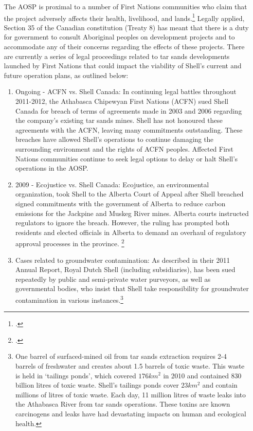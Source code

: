 The AOSP is proximal to a number of First Nations communities who claim that the project adversely affects their health, livelihood, and lands.\footcite[][]{RiskingRuin_2012}  
Legally applied, Section 35 of the Canadian constitution (Treaty 8) has meant that there is a duty for government to consult Aboriginal peoples on development projects and to accommodate any of their concerns regarding the effects of these projects. There are currently a series of legal proceedings related to tar sands developments launched by First Nations that could impact the viability of Shell's current and future operation plans, as outlined below:
\begin{enumerate}
	\item Ongoing - ACFN vs. Shell Canada: In continuing legal battles throughout 2011-2012, the Athabasca Chipewyan First Nations (ACFN) sued Shell Canada for breach of terms of agreements made in 2003 and 2006 regarding the company's existing tar sands mines. Shell has not honoured these agreements with the ACFN, leaving many commitments outstanding. These breaches have allowed Shell's operations to continue damaging the surrounding environment and the rights of ACFN peoples. Affected First Nations communities continue to seek legal options to delay or halt Shell's operations in the AOSP.
	\item 2009 - Ecojustice vs. Shell Canada: Ecojustice, an environmental organization, took Shell to the Alberta Court of Appeal after Shell breached signed commitments with the government of Alberta to reduce carbon emissions for the Jackpine and Muskeg River mines. Alberta courts instructed regulators to ignore the breach. However, the ruling has prompted both residents and elected officials in Alberta to demand an overhaul of regulatory approval processes in the province. \footcite[][]{RiskingRuin_2012}
	\item Cases related to groundwater contamination: As described in their 2011 Annual Report, Royal Dutch Shell (including subsidiaries), has been sued repeatedly by public and semi-private water purveyors, as well as governmental bodies, who insist that Shell take responsibility for groundwater contamination in various instances.\footnote{One barrel of surfaced-mined oil from tar sands extraction requires 2-4 barrels of freshwater and creates about 1.5 barrels of toxic waste. This waste is held in `tailings ponds', which covered $176 km^2$ in 2010 and contained 830 billion litres of toxic waste. Shell's tailings ponds cover $23 km^2$ and contain millions of litres of toxic waste. Each day, 11 million litres of waste leaks into the Athabasca River from tar sands operations. These toxins are known carcinogens and leaks have had devastating impacts on human and ecological health.} 

\end{enumerate}
